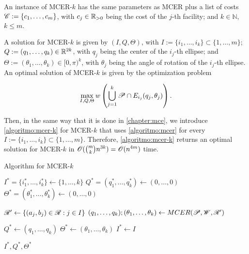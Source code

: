 An instance of MCER-$k$ has the same parameters as MCER plus a list of costs \mbox{$\mathscr{C}:=\{c_1, \dots, c_m\}$}, with $c_j\in\mathbb{R}_{>0}$ being the cost of the $j$-th facility; and $k\in\mathbb{N}$, $k\le m$.

A solution for MCER-$k$ is given by $(I, Q, \Theta)$, with $I:=\{i_1, \dots, i_k\}\subset \{1, \dots, m\}$; \\\mbox{$Q:=(q_1, \dots, q_k)\in\mathbb{R}^{2k}$}, with $q_j$ being the center of the $i_j$-th ellipse; and \mbox{$\Theta:=(\theta_1, \dots, \theta_k) \in [0, \pi)^k$}, with $\theta_j$ being the angle of rotation of the $i_j$-th ellipse. An optimal solution of MCER-$k$ is given by the optimization problem

\begin{equation*}
	\max_{I, Q, \Theta} w\left(\bigcup_{j=1}^k \mathscr{P} \cap E_{i_j}(q_j, \theta_j)\right).
\end{equation*}

Then, in the same way that it is done in \autoref{chapter:mce}, we introduce \autoref{algoritmo:mcer-k} for MCER-$k$ that uses \autoref{algoritmo:mcer} for every $I:=\{i_1, \dots, i_k\} \subset \{1, \dots, m\}$. Therefore, \autoref{algoritmo:mcer-k} returns an optimal solution for MCER-$k$ in $\mathscr{O}(\binom{m}{k}n^{3k}) = \mathscr{O}(n^{4m})$ time.

\begin{algoritmo}
	\caption{Algorithm for MCER-$k$}\label{algoritmo:mcer-k}
	
	
	\begin{algorithmic}[1]
		
		\item[]
		
		\State $I^* = \{i_1^*, \dots, i_k^*\}\gets \{1, \dots, k\}$
		\State $Q^* = (q_1^*, \dots, q_k^*) \gets (0, \dots, 0)$
		\State $\Theta^* = (\theta_1^*, \dots, \theta_k^*) \gets (0, \dots, 0)$
		
		
		\State $\mathscr{R}' \gets \{(a_j, b_j) \in \mathscr{R}: j \in I\}$
		\State $(q_1, \dots, q_k); (\theta_1, \dots, \theta_k) \gets MCER(\mathscr{P}, \mathscr{W}, \mathscr{R}')$
		
		\State $Q^* \gets (q_1, \dots, q_k)$
		\State $\Theta^* \gets (\theta_1, \dots, \theta_k)$
		\State $I^* \gets I$
		\EndIf
		\EndFor
		
		\State \Return $I^*, Q^*, \Theta^*$
		\EndProcedure
	\end{algorithmic}
\end{algoritmo}


